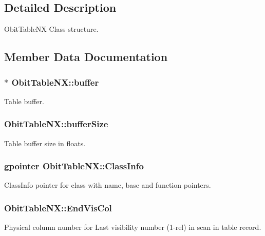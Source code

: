 \subsection{Detailed Description}
Obit\-Table\-NX Class structure. 



\subsection{Member Data Documentation}
\subsubsection{$\ast$ {\bf Obit\-Table\-NX::buffer}}\label{structObitTableNX_o10}


Table buffer. 

\subsubsection{ {\bf Obit\-Table\-NX::buffer\-Size}}\label{structObitTableNX_o11}


Table buffer size in floats. 

\subsubsection{\setlength{\rightskip}{0pt plus 5cm}gpointer {\bf Obit\-Table\-NX::Class\-Info}}\label{structObitTableNX_o1}


Class\-Info pointer for class with name, base and function pointers. 

\subsubsection{ {\bf Obit\-Table\-NX::End\-Vis\-Col}}\label{structObitTableNX_o26}


Physical column number for Last visibility number (1-rel) in scan in table record. 

